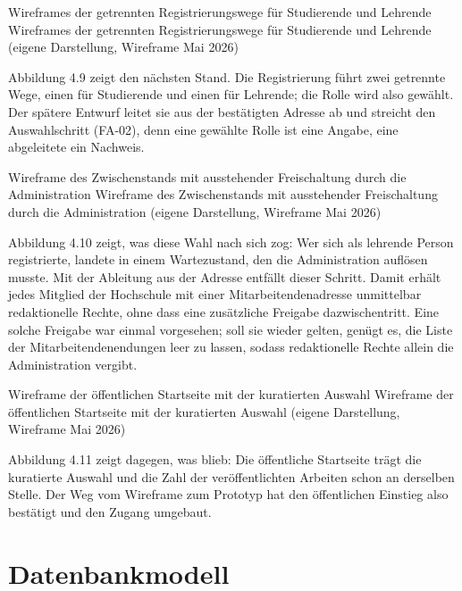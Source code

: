 %
{Wireframes der getrennten Registrierungswege für Studierende und Lehrende}%
{Wireframes der getrennten Registrierungswege für Studierende und Lehrende (eigene Darstellung, Wireframe Mai 2026)}

Abbildung 4.9 zeigt den nächsten Stand. Die Registrierung führt zwei getrennte Wege, einen für Studierende und einen für Lehrende; die Rolle wird also gewählt. Der spätere Entwurf leitet sie aus der bestätigten Adresse ab und streicht den Auswahlschritt (FA-02), denn eine gewählte Rolle ist eine Angabe, eine abgeleitete ein Nachweis.

%
{Wireframe des Zwischenstands mit ausstehender Freischaltung durch die Administration}%
{Wireframe des Zwischenstands mit ausstehender Freischaltung durch die Administration (eigene Darstellung, Wireframe Mai 2026)}

Abbildung 4.10 zeigt, was diese Wahl nach sich zog: Wer sich als lehrende Person registrierte, landete in einem Wartezustand, den die Administration auflösen musste. Mit der Ableitung aus der Adresse entfällt dieser Schritt. Damit erhält jedes Mitglied der Hochschule mit einer Mitarbeitendenadresse unmittelbar redaktionelle Rechte, ohne dass eine zusätzliche Freigabe dazwischentritt. Eine solche Freigabe war einmal vorgesehen; soll sie wieder gelten, genügt es, die Liste der Mitarbeitendenendungen leer zu lassen, sodass redaktionelle Rechte allein die Administration vergibt.

%
{Wireframe der öffentlichen Startseite mit der kuratierten Auswahl}%
{Wireframe der öffentlichen Startseite mit der kuratierten Auswahl (eigene Darstellung, Wireframe Mai 2026)}

Abbildung 4.11 zeigt dagegen, was blieb: Die öffentliche Startseite trägt die kuratierte Auswahl und die Zahl der veröffentlichten Arbeiten schon an derselben Stelle. Der Weg vom Wireframe zum Prototyp hat den öffentlichen Einstieg also bestätigt und den Zugang umgebaut.

\section{Datenbankmodell}
\label{sec:datenbankmodell}

